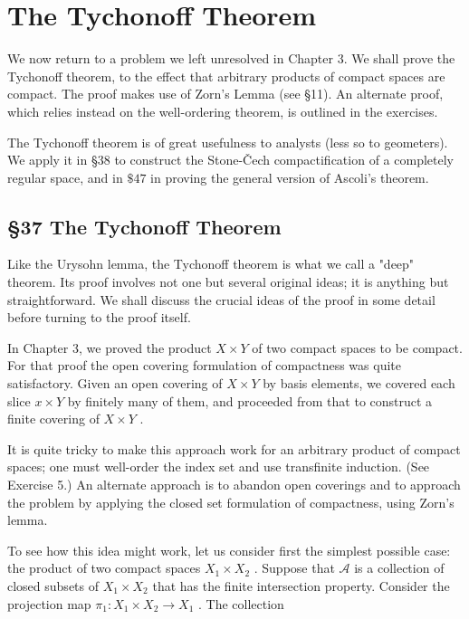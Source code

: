 \chapter{The Tychonoff Theorem}

We now return to a problem we left unresolved in Chapter 3. We shall prove the Tychonoff theorem, to the effect that arbitrary products of compact spaces are compact. The proof makes use of Zorn's Lemma (see §11). An alternate proof, which relies instead on the well-ordering theorem, is outlined in the exercises.

The Tychonoff theorem is of great usefulness to analysts (less so to geometers). We apply it in §38 to construct the Stone-Čech compactification of a completely regular space, and in \(\$ {47}\) in proving the general version of Ascoli’s theorem.

\section*{§37 The Tychonoff Theorem}

Like the Urysohn lemma, the Tychonoff theorem is what we call a "deep" theorem. Its proof involves not one but several original ideas; it is anything but straightforward. We shall discuss the crucial ideas of the proof in some detail before turning to the proof itself.

In Chapter 3, we proved the product \(X \times  Y\) of two compact spaces to be compact. For that proof the open covering formulation of compactness was quite satisfactory. Given an open covering of \(X \times  Y\) by basis elements, we covered each slice \(x \times  Y\) by finitely many of them, and proceeded from that to construct a finite covering of \(X \times  Y\) .

It is quite tricky to make this approach work for an arbitrary product of compact spaces; one must well-order the index set and use transfinite induction. (See Exercise 5.) An alternate approach is to abandon open coverings and to approach the problem by applying the closed set formulation of compactness, using Zorn's lemma.

To see how this idea might work, let us consider first the simplest possible case: the product of two compact spaces \({X}_{1} \times  {X}_{2}\) . Suppose that \(\mathcal{A}\) is a collection of closed subsets of \({X}_{1} \times  {X}_{2}\) that has the finite intersection property. Consider the projection map \({\pi }_{1} : {X}_{1} \times  {X}_{2} \rightarrow  {X}_{1}\) . The collection

